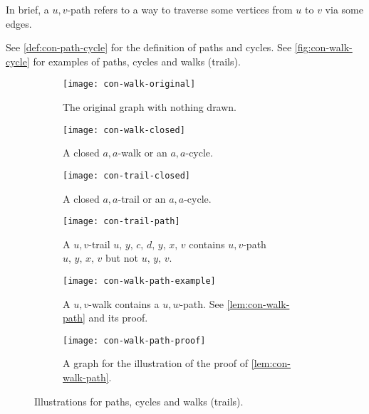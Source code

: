 \documentclass[../src/handouts/main.tex]{subfiles}
\begin{document}
In brief, a $u,v$-path refers to a way to traverse some vertices from $u$ to $v$ via some edges.

See \cref{def:con-path-cycle} for the definition of paths and cycles. See \cref{fig:con-walk-cycle} for examples of paths, cycles and walks (trails).

\begin{figure}[htbp]
  \centering
  \begin{subfigure}[t]{.4\textwidth}
    \centering
    \texttt{[image: con-walk-original]}
    \caption{The original graph with nothing drawn.}
    \label{fig:con-walk-original}
  \end{subfigure}
  \hspace{.1\textwidth}
  \begin{subfigure}[t]{.4\textwidth}
    \centering
    \texttt{[image: con-walk-closed]}
    \caption{A closed $a,a$-walk or an $a,a$-cycle.}
    \label{fig:con-walk-closed}
  \end{subfigure}

  \vspace{2em}

  \begin{subfigure}[t]{.4\textwidth}
    \centering
    \texttt{[image: con-trail-closed]}
    \caption{A closed $a,a$-trail or an $a,a$-cycle.}
    \label{fig:con-trail-closed}
  \end{subfigure}
  \hspace{.1\textwidth}
  \begin{subfigure}[t]{.4\textwidth}
    \centering
    \texttt{[image: con-trail-path]}
    \caption{A $u,v$-trail $u,\, y,\, c,\, d,\, y,\, x,\, v$ contains $u,v$-path $u,\, y,\, x,\, v$ but not $u,\, y,\, v$.}
    \label{fig:con-trail-path}
  \end{subfigure}

  \vspace{2em}

  \begin{subfigure}[t]{.4\textwidth}
    \centering
    \texttt{[image: con-walk-path-example]}
    \caption{A $u,v$-walk contains a $u,w$-path. See \cref{lem:con-walk-path} and its proof.}
    \label{fig:con-walk-path-example}
  \end{subfigure}
  \hspace{.1\textwidth}
  \begin{subfigure}[t]{.4\textwidth}
    \centering
    \texttt{[image: con-walk-path-proof]}
    \caption{A graph for the illustration of the proof of \cref{lem:con-walk-path}.}
    \label{fig:con-walk-path-proof}
  \end{subfigure}

  \caption{Illustrations for paths, cycles and walks (trails).}
  \label{fig:con-walk-trail}
\end{figure}
\end{document}
